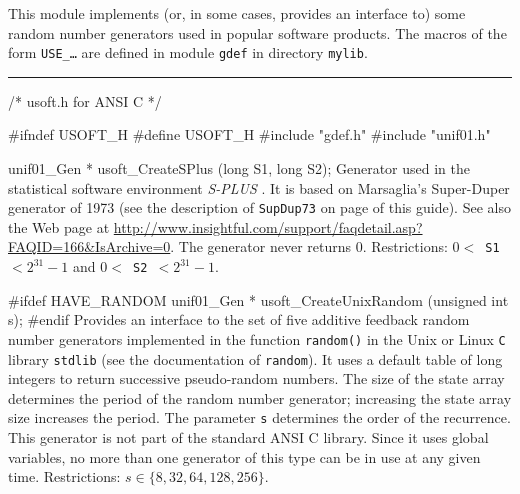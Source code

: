 
This module implements (or, in some cases, provides an interface to)
some random number generators used in popular software products.
The macros of the form {\tt USE\_\ldots} are defined in module
{\tt gdef} in directory {\tt mylib}.

\bigskip
\hrule
\code
\hide
/* usoft.h for ANSI C */

#ifndef USOFT_H
#define USOFT_H
\endhide
#include "gdef.h"
#include "unif01.h"


unif01_Gen * usoft_CreateSPlus (long S1, long S2);
\endcode
  \tab Generator used in the statistical software environment
%
    {\em S-PLUS\/} \cite{tRIP94a,tSPL00a}. It is based on Marsaglia's Super-Duper
   generator of 1973 (see the description of \texttt{SupDup73} on page
  \pageref{gen:SupDup73} of this guide). See also the Web page at
  \url{http://www.insightful.com/support/faqdetail.asp?FAQID=166&IsArchive=0}.
   The generator never returns 0.
   Restrictions: {\tt $0 <$ S1 $< 2^{31}-1$} and {\tt $0 <$ S2 $< 2^{31}-1$}.
  \endtab
\code


#ifdef HAVE_RANDOM
   unif01_Gen * usoft_CreateUnixRandom (unsigned int s);
#endif
\endcode
  \tab
  Provides an interface to the set of five additive feedback
   random number generators implemented in the function {\tt random()}
   in the Unix or Linux {\tt C} library {\tt stdlib}
%
   (see the documentation of {\tt random}).
   It uses a default table of
      long integers to return successive  pseudo-random  numbers.
      The size  of  the  state  array  determines  the  period  of the
     random number generator; increasing  the  state  array  size
     increases the period.
  The parameter {\tt s} determines the order of the recurrence.
  This generator is not part of the standard ANSI C library.
  Since it uses global variables, no more than one generator
  of this type can be in use at any given time.
  Restrictions: $s \in \{8, 32, 64, 128, 256\}$.
 \endtab
\code


